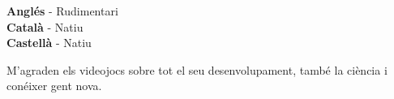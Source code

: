 \documentclass[9pt]{developercv} %
\begin{document}
\begin{minipage}[t]{0.3\textwidth}
	\vspace{-\baselineskip} %

	
	\textbf{Anglés} - Rudimentari\\
	\textbf{Català} - Natiu\\
	\textbf{Castellà} - Natiu
\end{minipage}
\hfill
\begin{minipage}[t]{0.3\textwidth}
	\vspace{-\baselineskip} %
	
	
   M'agraden els videojocs sobre tot el seu desenvolupament, també la ciència i conéixer gent nova.
	
\end{minipage}
\hfill

\end{document}
